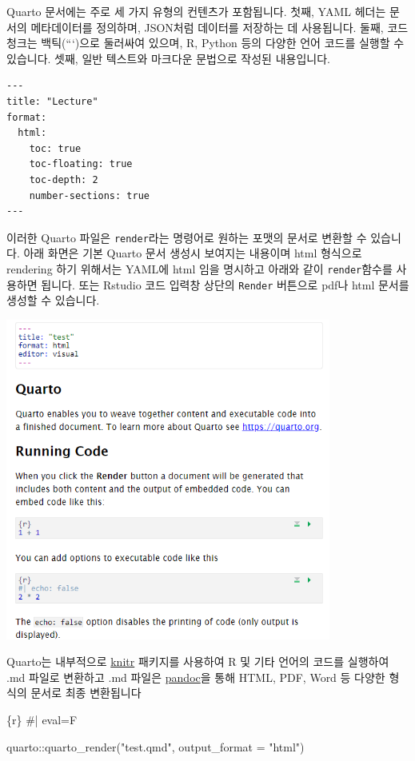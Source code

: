 \documentclass[
  a4paper,
]{book}
\newenvironment{Shaded}{\begin{snugshade}}{\end{snugshade}}
\newcommand{\AttributeTok}[1]{\textcolor[rgb]{0.40,0.45,0.13}{#1}}
\newcommand{\CommentTok}[1]{\textcolor[rgb]{0.37,0.37,0.37}{#1}}
\newcommand{\FunctionTok}[1]{\textcolor[rgb]{0.28,0.35,0.67}{#1}}
\newcommand{\InformationTok}[1]{\textcolor[rgb]{0.37,0.37,0.37}{#1}}
\newcommand{\NormalTok}[1]{\textcolor[rgb]{0.00,0.23,0.31}{#1}}
\newcommand{\SpecialCharTok}[1]{\textcolor[rgb]{0.37,0.37,0.37}{#1}}
\newcommand{\StringTok}[1]{\textcolor[rgb]{0.13,0.47,0.30}{#1}}
\begin{document}
Quarto 문서에는 주로 세 가지 유형의 컨텐츠가 포함됩니다. 첫째, YAML
헤더는 문서의 메타데이터를 정의하며, JSON처럼 데이터를 저장하는 데
사용됩니다. 둘째, 코드 청크는 백틱(```)으로 둘러싸여 있으며, R, Python
등의 다양한 언어 코드를 실행할 수 있습니다. 셋째, 일반 텍스트와 마크다운
문법으로 작성된 내용입니다.

\begin{verbatim}
---
title: "Lecture"
format: 
  html:
    toc: true
    toc-floating: true
    toc-depth: 2
    number-sections: true
---
\end{verbatim}

이러한 Quarto 파일은 \texttt{render}라는 명령어로 원하는 포맷의 문서로
변환할 수 있습니다. 아래 화면은 기본 Quarto 문서 생성시 보여지는
내용이며 html 형식으로 rendering 하기 위해서는 YAML에 html 임을 명시하고
아래와 같이 \texttt{render}함수를 사용하면 됩니다. 또는 Rstudio 코드
입력창 상단의 \texttt{Render} 버튼으로 pdf나 html 문서를 생성할 수
있습니다.

\includegraphics[width=4.20833in,height=\textheight]{images/image-1500245979.png}

Quarto는 내부적으로 \href{https://yihui.org/knitr/}{knitr} 패키지를
사용하여 R 및 기타 언어의 코드를 실행하여 .md 파일로 변환하고 .md 파일은
\href{https://pandoc.org/}{pandoc}을 통해 HTML, PDF, Word 등 다양한
형식의 문서로 최종 변환됩니다

\begin{Shaded}
\begin{Highlighting}[]
\InformationTok{\textasciigrave{}\textasciigrave{}\textasciigrave{}\{r\}}
\CommentTok{\#| eval=F}

\NormalTok{quarto}\SpecialCharTok{::}\FunctionTok{quarto\_render}\NormalTok{(}\StringTok{"test.qmd"}\NormalTok{, }\AttributeTok{output\_format =} \StringTok{"html"}\NormalTok{)}
\InformationTok{\textasciigrave{}\textasciigrave{}\textasciigrave{}}
\end{Highlighting}
\end{Shaded}
\end{document}
